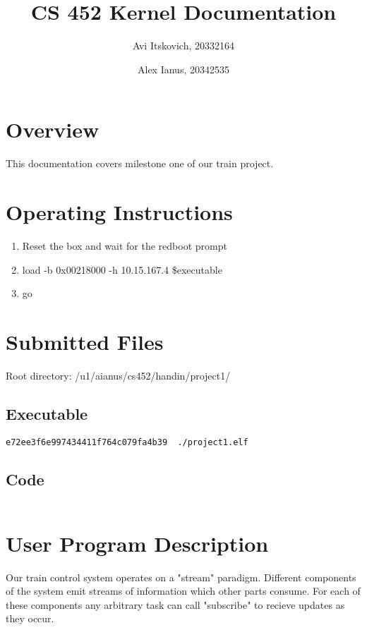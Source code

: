 \documentclass{article}
\title{CS 452 Kernel Documentation}
\author{
  Avi Itskovich, 20332164
  \and
  Alex Ianus, 20342535
}
\begin{document}
\maketitle

\section{Overview}

This documentation covers milestone one of our train project.

\section{Operating Instructions}
\begin{enumerate}
  \item Reset the box and wait for the redboot prompt
  \item load -b 0x00218000 -h 10.15.167.4 \$executable
  \item go
\end{enumerate}

\section{Submitted Files}
Root directory: /u1/aianus/cs452/handin/project1/

\subsection{Executable}
\begin{verbatim}
e72ee3f6e997434411f764c079fa4b39  ./project1.elf
\end{verbatim}

\subsection{Code}
\begin{verbatim}
\end{verbatim}

\section{User Program Description}

Our train control system operates on a "stream" paradigm. Different components of the system emit streams of information which other parts consume. For each of these components any arbitrary task can call "subscribe" to recieve updates as they occur.
\end{document}
